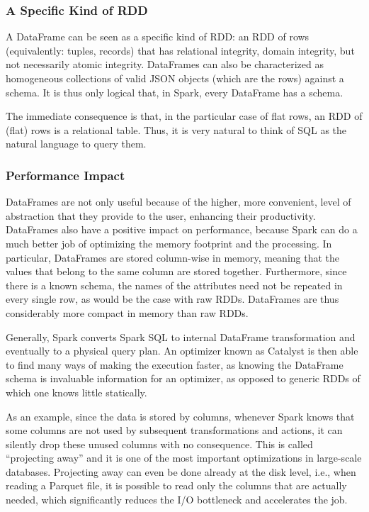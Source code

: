 \subsubsection{A Specific Kind of RDD}
A DataFrame can be seen as a specific kind of RDD: an RDD of rows (equivalently: tuples, records) that has relational integrity, domain integrity, but not necessarily atomic integrity. DataFrames can also be characterized as homogeneous collections of valid JSON objects (which are the rows) against a schema. It is thus only logical that, in Spark, every DataFrame has a schema.

The immediate consequence is that, in the particular case of flat rows, an RDD of (flat) rows is a relational table. Thus, it is very natural to think of SQL as the natural language to query them.

\subsubsection{Performance Impact}
DataFrames are not only useful because of the higher, more convenient, level of abstraction that they provide to the user, enhancing their productivity. DataFrames also have a positive impact on performance, because Spark can do a much better job of optimizing the memory footprint and the processing. In particular, DataFrames are stored column-wise in memory, meaning that the values that belong to the same column are stored together. Furthermore, since there is a known schema, the names of the attributes need not be repeated in every single row, as would be the case with raw RDDs. DataFrames are thus considerably more compact in memory than raw RDDs.

Generally, Spark converts Spark SQL to internal DataFrame transformation and eventually to a physical query plan. An optimizer known as Catalyst is then able to find many ways of making the execution faster, as knowing the DataFrame schema is invaluable information for an optimizer, as opposed to generic RDDs of which one knows little statically.

As an example, since the data is stored by columns, whenever Spark knows that some columns are not used by subsequent transformations and actions, it can silently drop these unused columns with no consequence. This is called “projecting away” and it is one of the most important optimizations in large-scale databases. Projecting away can even be done already at the disk level, i.e., when reading a Parquet file, it is possible to read only the columns that are actually needed, which significantly reduces the I/O bottleneck and accelerates the job.


